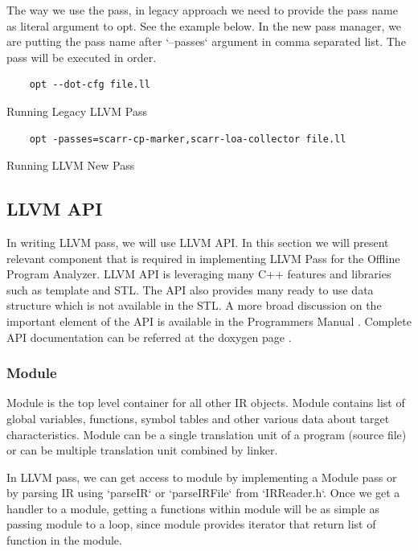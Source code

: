 The way we use the pass, in legacy approach we need to provide the pass name as literal argument to opt. See the example below. In the new pass manager, we are putting the pass name after `--passes` argument in comma separated list. The pass will be executed in order.

\begin{listing}
\begin{verbatim}
    opt --dot-cfg file.ll 
\end{verbatim}
\caption{Running Legacy LLVM Pass}    
\label{listing:2-3}
\end{listing}

\begin{listing}
\begin{verbatim}
    opt -passes=scarr-cp-marker,scarr-loa-collector file.ll 
\end{verbatim}
\caption{Running LLVM New Pass}    
\label{listing:2-4}
\end{listing}

\subsection{LLVM API}

In writing LLVM pass, we will use LLVM API. In this section we will present relevant component that is required in implementing LLVM Pass for the Offline Program Analyzer. LLVM API is leveraging many C++ features and libraries such as template and STL. The API also provides many ready to use data structure which is not available in the STL. A more broad discussion on the important element of the API is available in the Programmers Manual \cite{LLVMProgrammerManuala}. Complete API documentation can be referred at the doxygen page \cite{LLVMLLVMa}.

\subsubsection{Module}

Module is the top level container for all other IR objects. Module contains list of global variables, functions, symbol tables and other various data about target characteristics. Module can be a single translation unit of a program (source file) or can be multiple translation unit combined by linker. 

In LLVM pass, we can get access to module by implementing a Module pass or by
 parsing IR using `parseIR` or 
`parseIRFile` from 
`IRReader.h`. Once we get a handler to a module, getting a functions within 
module will be as simple as passing module to a loop, since module provides 
iterator that return list of function in the module.

